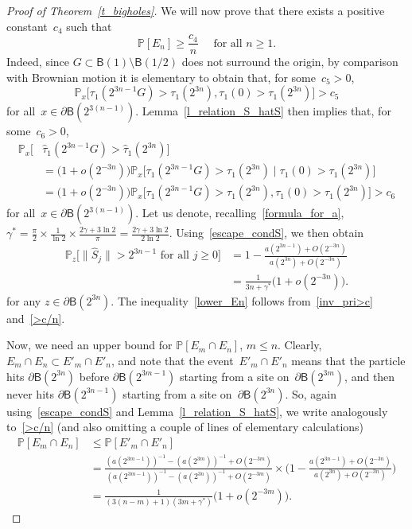 \documentclass[11pt]{article}
\theoremstyle{definition}
\numberwithin{equation}{section}
\numberwithin{figure}{section}
\numberwithin{table}{section}
\newcommand{\1}[1]{{\mathbf 1}{\{#1\}}}
\newcommand{\s}{{\widehat S}}
\newcommand{\8}{{\infty}}
\newcommand{\IP}{{\mathbb P}}
\newcommand{\htau}{\widehat{\tau}}
\newcommand{\B}{{\mathsf B}}
\begin{document}
\begin{proof}[Proof of Theorem~\ref{t_bigholes}]
We will now prove that there exists a positive constant~$c_4$ such that
\begin{equation}\label{lower_En}
\IP[E_n] \geq \frac{c_4}{n} \quad \text{ for all }n\geq 1.
\end{equation}
Indeed, since $G\subset\B(1)\setminus \B(1/2)$ does not surround the origin, by comparison with Brownian motion it is elementary to obtain that, for some~$c_5>0$,
\[
\IP_x\big[\tau_1(2^{3n-1}G)>\tau_1(2^{3n}),
\tau_1(0)>\tau_1(2^{3n}) \big] > c_5
\]
for all~$x\in\partial \B(2^{3(n-1)})$. Lemma~\ref{l_relation_S_hatS} then implies that, for some~$c_6>0$,
\begin{align}
\IP_x\big[&\htau_1(2^{3n-1}G)>\htau_1(2^{3n})\big]\nonumber\\
&= \big(1+o(2^{-3n})\big)
\IP_x\big[\tau_1(2^{3n-1}G)>\tau_1(2^{3n})
\mid \tau_1(0)>\tau_1(2^{3n})\big] \nonumber\\
&= \big(1+o(2^{-3n})\big)
\IP_x\big[\tau_1(2^{3n-1}G)>\tau_1(2^{3n}),
\tau_1(0)>\tau_1(2^{3n})\big] > c_6\label{inv_pri>c}
\end{align}
for all~$x\in\partial \B(2^{3(n-1)})$. Let us denote, recalling~\eqref{formula_for_a}, $\gamma^{*}=\frac{\pi}{2}\times\frac{1}{\ln 2} \times
\frac{2\gamma+ 3\ln 2}{\pi} =\frac{2\gamma+ 3\ln 2}{2\ln 2}$. Using~\eqref{escape_condS}, we then obtain
\begin{align}
\IP_z\big[\|\s_j\| > 2^{3n-1} \text{ for all } j\geq 0\big] & = 1- \frac{a(2^{3n-1})+O(2^{-3n})}{a(2^{3n})+O(2^{-3n})}
\nonumber\\
&= \frac{1}{3n+\gamma^{*}}\big(1+o(2^{-3n})\big).\label{>c/n}
\end{align}
for any $z\in\partial \B(2^{3n})$. The inequality~\eqref{lower_En} follows from~\eqref{inv_pri>c} and~\eqref{>c/n}.

Now, we need an upper bound for $\IP[E_m\cap E_n]$, $m\leq n$. Clearly, $E_m \cap E_n\subset E'_m \cap E'_n$, and note that the event~$E'_m \cap E'_n$ means that the particle hits $\partial\B(2^{3n})$ before $\partial\B(2^{3m-1})$ starting from a site on~$\partial\B(2^{3m})$, and then never hits $\partial\B(2^{3n-1})$ starting from a site on~$\partial\B(2^{3n})$. So, again using~\eqref{escape_condS} and Lemma~\ref{l_relation_S_hatS}, we write analogously to~\eqref{>c/n} (and also omitting a couple of lines of elementary calculations)
\begin{align}
\IP[E_m \cap E_n] & \leq \IP[E'_m \cap E'_n]\nonumber\\
& = \frac{(a(2^{3m-1}))^{-1}-(a(2^{3m}))^{-1}+O(2^{-3m})} {(a(2^{3m-1}))^{-1}-(a(2^{3n}))^{-1}+O(2^{-3m})}
\times \Big(1- \frac{a(2^{3n-1})+O(2^{-3n})}{a(2^{3n})+O(2^{-3n})}\Big)
\nonumber\\
& = \frac{1}{(3(n-m)+1)(3m+\gamma^{*})}\big(1+o(2^{-3m})\big).\label{EmEn_upper}
\end{align}


\end{proof}
\end{document}
